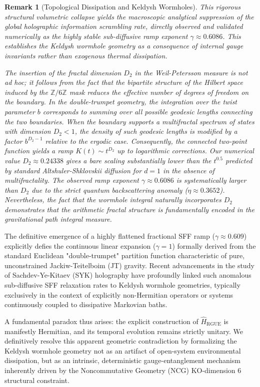 \documentclass[aps,prl,preprint,superscriptaddress,floatfix]{revtex4-2}
\newtheorem{remark}[theorem]{Remark}
\newcommand{\Zmod}{\mathbb{Z}/6\mathbb{Z}}
\begin{document}
\begin{remark}[Topological Dissipation and Keldysh Wormholes]
This rigorous structural volumetric collapse yields the macroscopic analytical suppression of the global holographic information scrambling rate, directly observed and validated numerically as the highly stable sub-diffusive ramp exponent $\gamma \approx 0.6086$. This establishes the Keldysh wormhole geometry as a consequence of internal gauge invariants rather than exogenous thermal dissipation.

The insertion of the fractal dimension $D_2$ in the Weil-Petersson measure is not ad hoc; it follows from the fact that the bipartite structure of the Hilbert space induced by the $\Zmod$ mask reduces the effective number of degrees of freedom on the boundary. In the double-trumpet geometry, the integration over the twist parameter $b$ corresponds to summing over all possible geodesic lengths connecting the two boundaries. When the boundary supports a multifractal spectrum of states with dimension $D_2<1$, the density of such geodesic lengths is modified by a factor $b^{D_2-1}$ relative to the ergodic case. Consequently, the connected two-point function yields a ramp $K(t)\sim t^{D_2}$ up to logarithmic corrections. Our numerical value $D_2\approx0.24338$ gives a bare scaling substantially lower than the $t^{0.5}$ predicted by standard Altshuler-Shklovskii diffusion for $d=1$ in the absence of multifractality. The observed ramp exponent $\gamma \approx 0.6086$ is systematically larger than $D_2$ due to the strict quantum backscattering anomaly ($\eta \approx 0.3652$). Nevertheless, the fact that the wormhole integral naturally incorporates $D_2$ demonstrates that the arithmetic fractal structure is fundamentally encoded in the gravitational path integral measure.
\end{remark}

The definitive emergence of a highly flattened fractional SFF ramp ($\gamma \approx 0.609$) explicitly defies the continuous linear expansion ($\gamma = 1$) formally derived from the standard Euclidean "double-trumpet" partition function characteristic of pure, unconstrained Jackiw-Teitelboim (JT) gravity. Recent advancements in the study of Sachdev-Ye-Kitaev (SYK) holography have profoundly linked such anomalous sub-diffusive SFF relaxation rates to Keldysh wormhole geometries, typically exclusively in the context of explicitly non-Hermitian operators or systems continuously coupled to dissipative Markovian baths. 

A fundamental paradox thus arises: the explicit construction of $\hat{H}_{\text{RGUE}}$ is manifestly Hermitian, and its temporal evolution remains strictly unitary. We definitively resolve this apparent geometric contradiction by formalizing the Keldysh wormhole geometry not as an artifact of open-system environmental dissipation, but as an intrinsic, deterministic gauge-entanglement mechanism inherently driven by the Noncommutative Geometry (NCG) KO-dimension 6 structural constraint.
\end{document}
